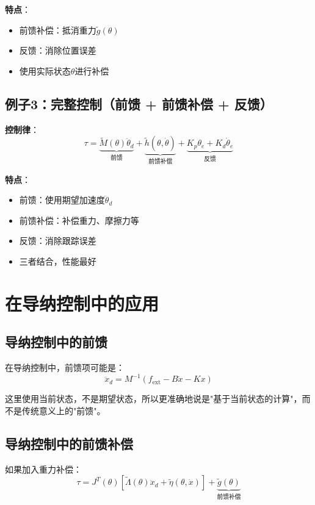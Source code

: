 \documentclass[12pt,a4paper]{article}
\begin{document}
\textbf{特点}：
\begin{itemize}
\item 前馈补偿：抵消重力$\tilde{g}(\theta)$
\item 反馈：消除位置误差
\item 使用实际状态$\theta$进行补偿
\end{itemize}

\subsection{例子3：完整控制（前馈 + 前馈补偿 + 反馈）}

\textbf{控制律}：
\begin{equation}
\tau = \underbrace{\tilde{M}(\theta)\ddot{\theta}_d}_{\text{前馈}} + \underbrace{\tilde{h}(\theta, \dot{\theta})}_{\text{前馈补偿}} + \underbrace{K_p\theta_e + K_d\dot{\theta}_e}_{\text{反馈}}
\end{equation}

\textbf{特点}：
\begin{itemize}
\item 前馈：使用期望加速度$\ddot{\theta}_d$
\item 前馈补偿：补偿重力、摩擦力等
\item 反馈：消除跟踪误差
\item 三者结合，性能最好
\end{itemize}

\section{在导纳控制中的应用}

\subsection{导纳控制中的前馈}

在导纳控制中，前馈项可能是：
\begin{equation}
\ddot{x}_d = M^{-1}(f_{\text{ext}} - B\dot{x} - Kx)
\end{equation}

这里使用当前状态，不是期望状态，所以更准确地说是"基于当前状态的计算"，而不是传统意义上的"前馈"。

\subsection{导纳控制中的前馈补偿}

如果加入重力补偿：
\begin{equation}
\tau = J^T(\theta)\left[\tilde{\Lambda}(\theta)\ddot{x}_d + \tilde{\eta}(\theta, \dot{x})\right] + \underbrace{\tilde{g}(\theta)}_{\text{前馈补偿}}
\end{equation}
\end{document}

